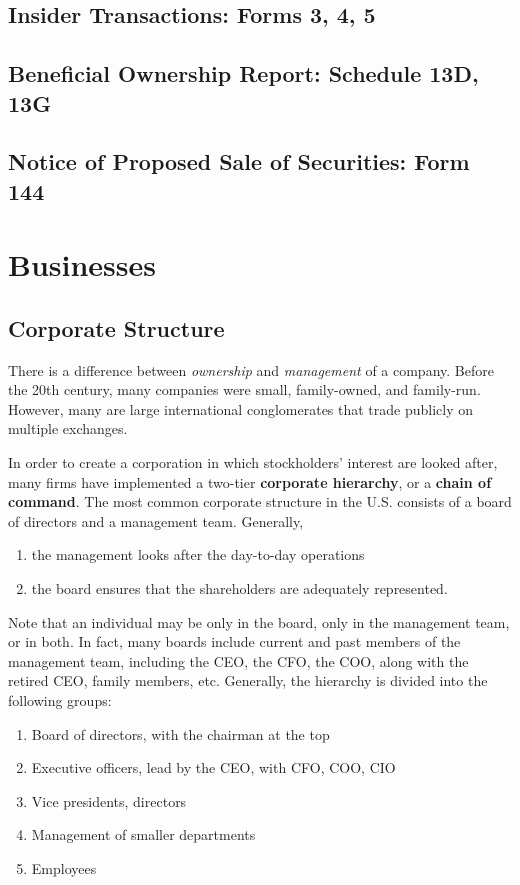 \documentclass{article}
\begin{document}
  \subsection{Insider Transactions: Forms 3, 4, 5}

  \subsection{Beneficial Ownership Report: Schedule 13D, 13G}

  \subsection{Notice of Proposed Sale of Securities: Form 144}

\section{Businesses}

  \subsection{Corporate Structure}

    There is a difference between \textit{ownership} and \textit{management} of a company. Before the 20th century, many companies were small, family-owned, and family-run. However, many are large international conglomerates that trade publicly on multiple exchanges. 

    \begin{definition}
      In order to create a corporation in which stockholders' interest are looked after, many firms have implemented a two-tier \textbf{corporate hierarchy}, or a \textbf{chain of command}. The most common corporate structure in the U.S. consists of a board of directors and a management team. Generally, 
      \begin{enumerate}
          \item the management looks after the day-to-day operations
          \item the board ensures that the shareholders are adequately represented. 
      \end{enumerate}
      Note that an individual may be only in the board, only in the management team, or in both. In fact, many boards include current and past members of the management team, including the CEO, the CFO, the COO, along with the retired CEO, family members, etc. Generally, the hierarchy is divided into the following groups: 
      \begin{enumerate}
          \item Board of directors, with the chairman at the top
          \item Executive officers, lead by the CEO, with CFO, COO, CIO
          \item Vice presidents, directors 
          \item Management of smaller departments
          \item Employees
      \end{enumerate}
    \end{definition}
\end{document}
